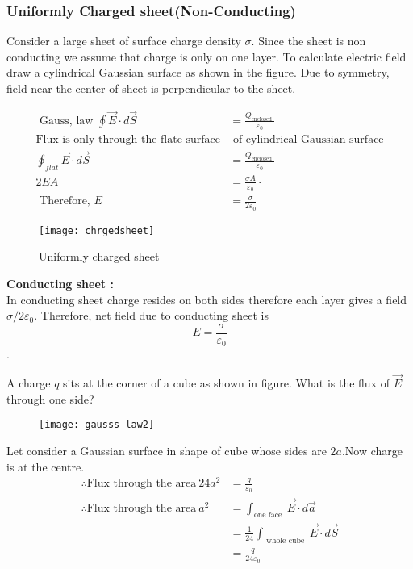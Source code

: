 \subsubsection{Uniformly Charged sheet(Non-Conducting)}
Consider a large sheet of surface charge density $\sigma$. Since the sheet is non conducting we assume that charge is only on one layer. To calculate electric field draw a cylindrical Gaussian surface as shown in the figure. Due to symmetry, field near the center of sheet is perpendicular to the sheet.\\
\begin{minipage}{0.75\textwidth}
	\begin{align*}
	\text { Gauss, law } \oint \vec{E} \cdot d \vec{S}&=\frac{Q_{\text {enclosed }}}{\varepsilon_{0}}\\
	\text{Flux is only through the flate surface}&\text{ of cylindrical Gaussian surface}\\
	\oint_{flat} \vec{E} \cdot d \vec{S}&=\frac{Q_{\text {enclosed }}}{\varepsilon_{0}}\\
	2 E A&=\frac{\sigma A}{\varepsilon_{0}} \cdot\\ \text { Therefore, } E&=\frac{\sigma}{2 \varepsilon_{0}}
	\end{align*}
\end{minipage}
\begin{minipage}{0.25\textwidth}\hfil
	\begin{figure}[H]
		\texttt{[image: chrgedsheet]}
		\caption{Uniformly charged sheet}
	\end{figure}
\end{minipage}
\textbf{Conducting sheet :}\\ In conducting sheet charge resides on both sides therefore each layer gives a field $\sigma / 2 \varepsilon_{0}$.
Therefore, net field due to conducting sheet is $$E=\frac{\sigma}{\varepsilon_{0}}$$.
\begin{exercise}
	 A charge $q$ sits at the corner of a cube as shown in figure. What is the flux of $\vec{E}$ through one side?
	 \begin{figure}[H]
	 	\begin{center}
	 		\texttt{[image: gausss law2]}
	 	\end{center}
	 \end{figure}
\end{exercise}
\begin{answer}
	Let consider a Gaussian surface in shape of cube whose sides are $2 a$.Now charge is at the centre.
	\begin{align*}
	\therefore  \text{Flux through the area}\ 24 a^{2} &= \frac{q}{\varepsilon_{0}}\\
	\therefore \text{Flux through the area}\ a^{2} &= \int_{\text {one face }} \vec{E} \cdot d \vec{a}\\&=\frac{1}{24} \int_{\text { whole  cube }} \vec{E} \cdot d \vec{S}\\&=\frac{q}{24 \varepsilon_{0}}
	\end{align*}
	
	
\end{answer}
